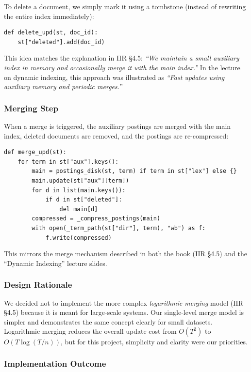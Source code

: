 \documentclass[11pt,a4paper]{article}
\begin{document}
To delete a document, we simply mark it using a tombstone (instead of rewriting the entire index immediately):
\begin{verbatim}
def delete_upd(st, doc_id):
    st["deleted"].add(doc_id)
\end{verbatim}

This idea matches the explanation in IIR §4.5:
\textit{“We maintain a small auxiliary index in memory and occasionally merge it with the main index.”}
In the lecture on dynamic indexing, this approach was illustrated as 
\textit{“Fast updates using auxiliary memory and periodic merges.”}

\subsubsection{Merging Step}

When a merge is triggered, the auxiliary postings are merged with the main index,
deleted documents are removed, and the postings are re-compressed:
\begin{verbatim}
def merge_upd(st):
    for term in st["aux"].keys():
        main = postings_disk(st, term) if term in st["lex"] else {}
        main.update(st["aux"][term])
        for d in list(main.keys()):
            if d in st["deleted"]:
                del main[d]
        compressed = _compress_postings(main)
        with open(_term_path(st["dir"], term), "wb") as f:
            f.write(compressed)
\end{verbatim}

This mirrors the merge mechanism described in both the book (IIR §4.5) and the “Dynamic Indexing” lecture slides.

\subsubsection{Design Rationale}

We decided not to implement the more complex \textit{logarithmic merging} model (IIR §4.5) because it is meant for large-scale systems.
Our single-level merge model is simpler and demonstrates the same concept clearly for small datasets.
Logarithmic merging reduces the overall update cost from $O(T^2)$ to $O(T \log (T/n))$, but for this project, simplicity and clarity were our priorities.

\subsubsection{Implementation Outcome}
\end{document}
